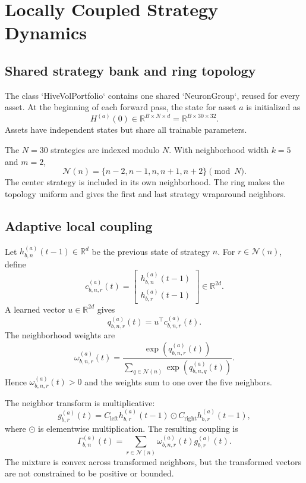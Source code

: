 \documentclass[10pt,a4paper,twocolumn]{article}
\newcommand{\R}{\mathbb{R}}
\begin{document}
\section{Locally Coupled Strategy Dynamics}
\subsection{Shared strategy bank and ring topology}
The class `HiveVolPortfolio` contains one shared `NeuronGroup`, reused for every asset. At the beginning of each forward pass, the state for asset $a$ is initialized as
\begin{equation}
H^{(a)}(0)\in\R^{B\times N\times d}=\R^{B\times30\times32}.
\end{equation}
Assets have independent states but share all trainable parameters.

The $N=30$ strategies are indexed modulo $N$. With neighborhood width $k=5$ and $m=2$,
\begin{equation}
\mathcal{N}(n)=\{n-2,n-1,n,n+1,n+2\}\pmod N.
\end{equation}
The center strategy is included in its own neighborhood. The ring makes the topology uniform and gives the first and last strategy wraparound neighbors.

\subsection{Adaptive local coupling}
Let $h_{b,n}^{(a)}(t-1)\in\R^d$ be the previous state of strategy $n$. For $r\in\mathcal{N}(n)$, define
\begin{equation}
c_{b,n,r}^{(a)}(t)=\begin{bmatrix}h_{b,n}^{(a)}(t-1)\\h_{b,r}^{(a)}(t-1)\end{bmatrix}\in\R^{2d}.
\end{equation}
A learned vector $u\in\R^{2d}$ gives
\begin{equation}
q_{b,n,r}^{(a)}(t)=u^\top c_{b,n,r}^{(a)}(t).
\end{equation}
The neighborhood weights are
\begin{equation}
\omega_{b,n,r}^{(a)}(t)=
\frac{\exp(q_{b,n,r}^{(a)}(t))}
{\sum_{q\in\mathcal{N}(n)}\exp(q_{b,n,q}^{(a)}(t))}.
\end{equation}
Hence $\omega_{b,n,r}^{(a)}(t)>0$ and the weights sum to one over the five neighbors.

The neighbor transform is multiplicative:
\begin{equation}
g_{b,r}^{(a)}(t)=C_{\mathrm{left}}h_{b,r}^{(a)}(t-1)\odot C_{\mathrm{right}}h_{b,r}^{(a)}(t-1),
\end{equation}
where $\odot$ is elementwise multiplication. The resulting coupling is
\begin{equation}
\Gamma_{b,n}^{(a)}(t)=\sum_{r\in\mathcal{N}(n)}\omega_{b,n,r}^{(a)}(t)g_{b,r}^{(a)}(t).
\end{equation}
The mixture is convex across transformed neighbors, but the transformed vectors are not constrained to be positive or bounded.
\end{document}
